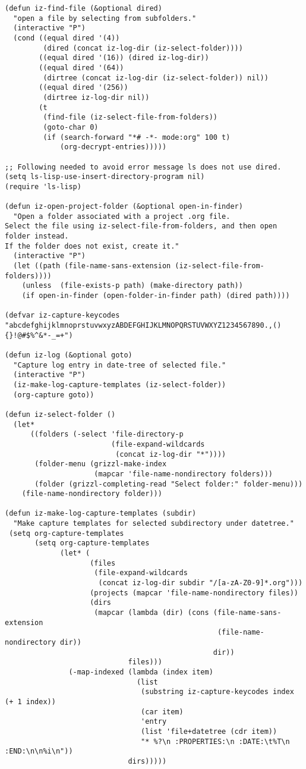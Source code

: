 \documentclass[10pt]{article}
\begin{document}
\begin{verbatim}
(defun iz-find-file (&optional dired)
  "open a file by selecting from subfolders."
  (interactive "P")
  (cond ((equal dired '(4))
         (dired (concat iz-log-dir (iz-select-folder))))
        ((equal dired '(16)) (dired iz-log-dir))
        ((equal dired '(64))
         (dirtree (concat iz-log-dir (iz-select-folder)) nil))
        ((equal dired '(256))
         (dirtree iz-log-dir nil))
        (t
         (find-file (iz-select-file-from-folders))
         (goto-char 0)
         (if (search-forward "*# -*- mode:org" 100 t)
             (org-decrypt-entries)))))

;; Following needed to avoid error message ls does not use dired.
(setq ls-lisp-use-insert-directory-program nil)
(require 'ls-lisp)

(defun iz-open-project-folder (&optional open-in-finder)
  "Open a folder associated with a project .org file.
Select the file using iz-select-file-from-folders, and then open folder instead.
If the folder does not exist, create it."
  (interactive "P")
  (let ((path (file-name-sans-extension (iz-select-file-from-folders))))
    (unless  (file-exists-p path) (make-directory path))
    (if open-in-finder (open-folder-in-finder path) (dired path))))

(defvar iz-capture-keycodes "abcdefghijklmnoprstuvwxyzABDEFGHIJKLMNOPQRSTUVWXYZ1234567890.,(){}!@#$%^&*-_=+")

(defun iz-log (&optional goto)
  "Capture log entry in date-tree of selected file."
  (interactive "P")
  (iz-make-log-capture-templates (iz-select-folder))
  (org-capture goto))

(defun iz-select-folder ()
  (let*
      ((folders (-select 'file-directory-p
                         (file-expand-wildcards
                          (concat iz-log-dir "*"))))
       (folder-menu (grizzl-make-index
                     (mapcar 'file-name-nondirectory folders)))
       (folder (grizzl-completing-read "Select folder:" folder-menu)))
    (file-name-nondirectory folder)))

(defun iz-make-log-capture-templates (subdir)
  "Make capture templates for selected subdirectory under datetree."
 (setq org-capture-templates
       (setq org-capture-templates
             (let* (
                    (files
                     (file-expand-wildcards
                      (concat iz-log-dir subdir "/[a-zA-Z0-9]*.org")))
                    (projects (mapcar 'file-name-nondirectory files))
                    (dirs
                     (mapcar (lambda (dir) (cons (file-name-sans-extension
                                                  (file-name-nondirectory dir))
                                                 dir))
                             files)))
               (-map-indexed (lambda (index item)
                               (list
                                (substring iz-capture-keycodes index (+ 1 index))
                                (car item)
                                'entry
                                (list 'file+datetree (cdr item))
                                "* %?\n :PROPERTIES:\n :DATE:\t%T\n :END:\n\n%i\n"))
                             dirs)))))


\end{verbatim}
\end{document}
